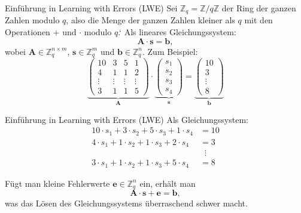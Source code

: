 \begin{frame}{Einführung in Learning with Errors (LWE)}
    Sei $\mathbb{Z}_q = \mathbb{Z}/q\mathbb{Z}$ der Ring der ganzen Zahlen modulo $q$, also die Menge der ganzen Zahlen kleiner
    als $q$ mit den Operationen $+$ und $\cdot$ modulo $q$.\newline`
    Als lineares Gleichungssystem:
    \[
        \mathbf{A} \cdot \mathbf{s} = \mathbf{b},
    \]
    wobei $\mathbf{A} \in \mathbb{Z}_q^{n \times m}$, $\mathbf{s} \in \mathbb{Z}_q^{m}$ und $\mathbf{b} \in \mathbb{Z}_q^{n}$.
    \newline
    \newline
    \centering
    Zum Beispiel:
    \[
        \underbrace{\begin{pmatrix}
            10 & 3 & 5 & 1 \\
            4  & 1 & 1 & 2 \\
            \vdots & \vdots & \vdots & \vdots \\
            3  & 1 & 1 & 5
        \end{pmatrix}}_{\mathbf{A}}
        \cdot
        \underbrace{\begin{pmatrix}
            s_1 \\ s_2 \\ s_3 \\ s_4
        \end{pmatrix}}_{\mathbf{s}}
        =
        \underbrace{\begin{pmatrix}
            10 \\ 3 \\ \vdots \\ 8
        \end{pmatrix}}_{\mathbf{b}}
    \]
    \note{

    }
\end{frame}

\begin{frame}{Einführung in Learning with Errors (LWE)}
    Als Gleichungssystem:
    \begin{align*}
        10 \cdot s_1 + 3 \cdot s_2 + 5 \cdot s_3 + 1 \cdot s_4 &= 10 \\
        4 \cdot s_1 + 1 \cdot s_2 + 1 \cdot s_3 + 2 \cdot s_4 &= 3 \\
        &\;\;\vdots \\
        3 \cdot s_1 + 1 \cdot s_2 + 1 \cdot s_3 + 5 \cdot s_4 &= 8
    \end{align*}

    Fügt man kleine Fehlerwerte $\mathbf{e} \in \mathbb{Z}_q^{n}$ ein, erhält man
    \[
        \mathbf{A} \cdot \mathbf{s} + \mathbf{e} = \mathbf{b},
    \]
    was das Lösen des Gleichungssystems überraschend schwer macht.
\end{frame}


